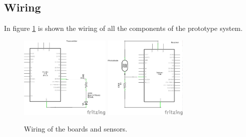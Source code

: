 \subsection{Wiring}
In figure \ref{fig:wiringDC} is shown the wiring of all the components of the prototype system.

\begin{figure}[hbt]
\centering
  \includegraphics[height=150px]{img/transmitter_schem1}
  \includegraphics[height=150px]{img/receiver_schem1}
  \caption{Wiring of the boards and sensors.}
  \label{fig:wiringDC}
\end{figure}



